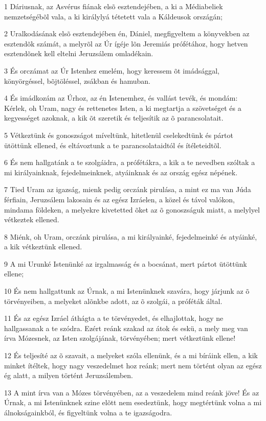 \par 1 Dáriusnak, az Asvérus fiának elsõ esztendejében, a ki a Médiabeliek nemzetségébõl vala, a ki királylyá tétetett vala a Káldeusok országán;
\par 2 Uralkodásának elsõ esztendejében én, Dániel, megfigyeltem a könyvekben az esztendõk számát, a melyrõl az Úr ígéje lõn Jeremiás prófétához, hogy hetven esztendõnek kell eltelni Jeruzsálem omladékain.
\par 3 És orczámat az Úr Istenhez emelém, hogy keressem õt imádsággal, könyörgéssel, bõjtöléssel, zsákban és hamuban.
\par 4 És imádkozám az Úrhoz, az én Istenemhez, és vallást tevék, és mondám: Kérlek, oh Uram, nagy és rettenetes Isten, a ki megtartja a szövetséget és a kegyességet azoknak, a kik õt szeretik és teljesítik az õ parancsolatait.
\par 5 Vétkeztünk és gonoszságot míveltünk, hitetlenül cselekedtünk és pártot ütöttünk ellened, és eltávoztunk a te parancsolataidtól és ítéleteidtõl.
\par 6 És nem hallgatánk a te szolgáidra, a prófétákra, a kik a te nevedben szóltak a mi királyainknak, fejedelmeinknek, atyáinknak és az ország egész népének.
\par 7 Tied Uram az igazság, mienk pedig orczánk pirulása, a mint ez ma van Júda férfiain, Jeruzsálem lakosain és az egész Izráelen, a közel és távol valókon, mindama földeken, a melyekre kivetetted õket az õ gonoszságuk miatt, a melylyel vétkeztek ellened.
\par 8 Miénk, oh Uram, orczánk pirulása, a mi királyainké, fejedelmeinké és atyáinké, a kik vétkeztünk ellened.
\par 9 A mi Urunké Istenünké az irgalmasság és a bocsánat, mert  pártot ütöttünk ellene;
\par 10 És nem hallgattunk az Úrnak, a mi Istenünknek szavára, hogy járjunk az õ törvényeiben, a melyeket alõnkbe adott, az õ szolgái, a próféták által.
\par 11 És az egész Izráel áthágta a te törvényedet, és elhajlottak, hogy ne hallgassanak a te szódra. Ezért reánk szakad az átok és eskü, a mely meg van írva Mózesnek, az Isten szolgájának, törvényében; mert vétkeztünk ellene!
\par 12 És teljesíté az õ szavait, a melyeket szóla ellenünk, és a mi bíráink ellen, a kik minket ítéltek, hogy nagy veszedelmet hoz reánk; mert nem történt olyan az egész ég alatt, a milyen történt Jeruzsálemben.
\par 13 A mint írva van a Mózes törvényében, az a veszedelem mind reánk jöve! És az Úrnak, a mi Istenünknek szine elõtt nem esedeztünk, hogy megtértünk volna a mi álnokságainkból, és figyeltünk volna a te igazságodra.

